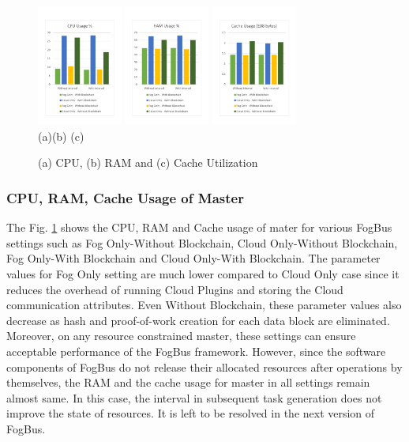 \documentclass[final,5p,times,twocolumn]{elsarticle}
\begin{document}
\begin{figure}[!b]
	\begin{center}
		\includegraphics[width=28mm, height=40mm]{CPU}
		\hspace{1pt}
		\includegraphics[width=28mm, height=40mm]{RAM}
		\hspace{1pt}
		\includegraphics[width=28mm, height=40mm]{CACHE}\\
        \footnotesize{(a)\hspace{60pt}(b) \hspace{60pt}(c)}\\		 
   	\caption{(a) CPU, (b) RAM and (c) Cache Utilization} \label{fig:crc}
	\end{center}
\end{figure}
%
%
\subsubsection{CPU, RAM, Cache Usage of Master}
%
The Fig. \ref{fig:crc} shows the CPU, RAM and Cache usage of mater for various FogBus settings such as Fog Only-Without Blockchain, Cloud Only-Without Blockchain, Fog Only-With Blockchain and Cloud Only-With Blockchain. The parameter values for Fog Only setting are much lower compared to Cloud Only case since it reduces the overhead of running Cloud Plugins and storing the Cloud communication attributes. Even Without Blockchain, these parameter values also decrease as hash and proof-of-work creation for each data block are eliminated. Moreover, on any resource constrained master, these settings can ensure acceptable performance of the FogBus framework. However, since the software components of FogBus do not release their allocated resources after operations by themselves, the RAM and the cache usage for master in all settings remain almost same. In this case, the interval in subsequent task generation does not improve the state of resources. It is left to be resolved in the next version of FogBus.        
%
\end{document}
